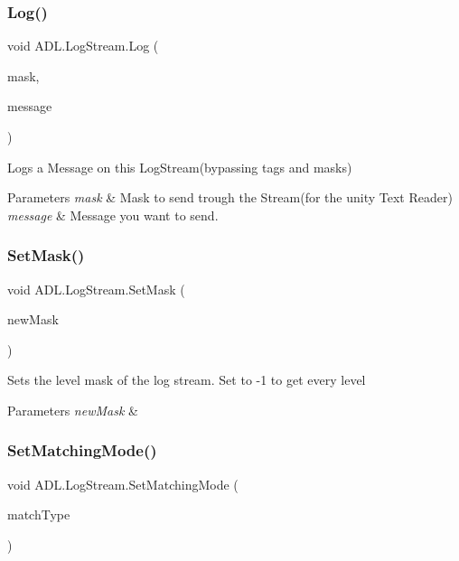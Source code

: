 \subsubsection{\texorpdfstring{Log()}{Log()}}
{\footnotesize\ttfamily void A\+D\+L.\+Log\+Stream.\+Log (\begin{DoxyParamCaption}\item[{int}]{mask,  }\item[{string}]{message }\end{DoxyParamCaption})}



Logs a Message on this Log\+Stream(bypassing tags and masks) 


\begin{DoxyParams}{Parameters}
{\em mask} & Mask to send trough the Stream(for the unity Text Reader)\\
\hline
{\em message} & Message you want to send.\\
\hline
\end{DoxyParams}
\mbox{\label{class_a_d_l_1_1_log_stream_a7a1a25f0247d4ebfeb5a4d6e37fe4e3a}} 
\subsubsection{\texorpdfstring{Set\+Mask()}{SetMask()}}
{\footnotesize\ttfamily void A\+D\+L.\+Log\+Stream.\+Set\+Mask (\begin{DoxyParamCaption}\item[{int}]{new\+Mask }\end{DoxyParamCaption})}



Sets the level mask of the log stream. Set to -\/1 to get every level 


\begin{DoxyParams}{Parameters}
{\em new\+Mask} & \\
\hline
\end{DoxyParams}
\mbox{\label{class_a_d_l_1_1_log_stream_af66833a158ebb7d8e079810bb2b8f50e}} 
\subsubsection{\texorpdfstring{Set\+Matching\+Mode()}{SetMatchingMode()}}
{\footnotesize\ttfamily void A\+D\+L.\+Log\+Stream.\+Set\+Matching\+Mode (\begin{DoxyParamCaption}\item[{\mbox{\hyperlink{namespace_a_d_l_af6334296dbae0383a652317263f0bc05}{Match\+Type}}}]{match\+Type }\end{DoxyParamCaption})}




